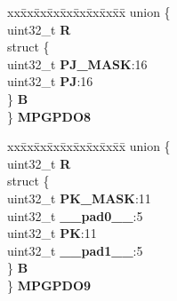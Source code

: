 \begin{DoxyCompactItemize}
\begin{tabbing}
\end{tabbing}\item 
\mbox{\label{structSIU__tag_ab66371cc72ec45fbba1115e64cfa49ba}} 
\begin{tabbing}
xx\=xx\=xx\=xx\=xx\=xx\=xx\=xx\=xx\=\kill
union \{\\
\>uint32\_t {\bfseries R}\\
\>struct \{\\
\>\>uint32\_t {\bfseries PJ\_MASK}:16\\
\>\>uint32\_t {\bfseries PJ}:16\\
\>\} {\bfseries B}\\
\} {\bfseries MPGPDO8}\\

\end{tabbing}\item 
\mbox{\label{structSIU__tag_ac5b738e929cb9e48738354bf599ceaec}} 
\begin{tabbing}
xx\=xx\=xx\=xx\=xx\=xx\=xx\=xx\=xx\=\kill
union \{\\
\>uint32\_t {\bfseries R}\\
\>struct \{\\
\>\>uint32\_t {\bfseries PK\_MASK}:11\\
\>\>uint32\_t {\bfseries \_\_pad0\_\_}:5\\
\>\>uint32\_t {\bfseries PK}:11\\
\>\>uint32\_t {\bfseries \_\_pad1\_\_}:5\\
\>\} {\bfseries B}\\
\} {\bfseries MPGPDO9}\\


\end{tabbing}
\end{DoxyCompactItemize}
